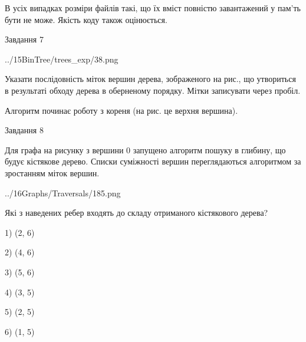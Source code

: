 \documentclass[12pt, ukrainian]{article}
\begin{document}
{В усіх випадках розміри файлів такі, що їх вміст повністю завантажений у пам'ть бути не може. Якість коду також оцінюється.



\vspace{10mm}\par

\newpage
\begin{minipage}[t]{9.7cm}
               
{\begin{center}Завдання {7}\end{center}}
\vspace{-4mm}

\begin{center}
	{../15BinTree/trees_exp/38.png}
\end{center}
Указати послідовність міток вершин дерева, зображеного на рис., що утвориться в результаті обходу дерева в оберненому порядку. Мітки записувати через пробіл.\par Алгоритм починає роботу з кореня (на рис. це верхня вершина).\par

\end{minipage}
\vline \hspace{8mm}
\begin{minipage}[t]{8.0cm}
               
{\begin{center}Завдання {8}\end{center}}
\vspace{-4mm}
Для графа на рисунку з вершини 0 запущено алгоритм пошуку в глибину, що будує кістякове дерево. Списки суміжності вершин переглядаються алгоритмом за зростанням міток вершин.\par
\begin{center}
	{../16Graphs/Traversals/185.png}
\end{center}
\par Які з наведених ребер входять до складу отриманого кістякового дерева?\par
1) (2, 6)\par
2) (4, 6)\par
3) (5, 6)\par
4) (3, 5)\par
5) (2, 5)\par
6) (1, 5)\par
{\vskip 15pt} \par


\end{minipage}}
\end{document}
